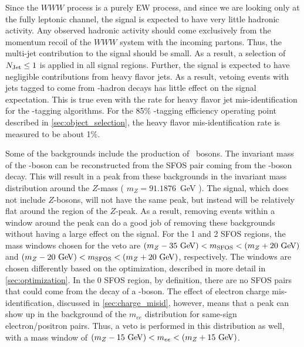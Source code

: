 




Since the $WWW$ process is a purely EW process, and since
we are looking only at the fully leptonic channel, the 
signal is expected to have very little hadronic 
activity. Any observed hadronic activity should come exclusively
from the momentum recoil of the $WWW$ system with the incoming
partons. Thus, the multi-jet contribution to the signal
should be small. As a result, a selection of $N_{\textrm{Jet}} \leq 1$
is applied in all signal regions.
Further, the signal is 
expected to have negligible contributions
from heavy flavor jets. As a result, vetoing events with jets
tagged to come from \bee-hadron decays has
little effect on the signal expectation. This is true even with 
the rate for heavy flavor jet mis-identification for the 
\bee-tagging algorithms. For the 
85\% \bee-tagging efficiency operating point described in 
\sec\ref{sec:object_selection}, the heavy flavor
mis-identification rate is measured to be about 1\%. %


Some of the backgrounds include the production of \z~bosons.
The invariant mass of the \z-boson can be reconstructed from the SFOS
pair coming from the \z-boson decay. 
This will result in a peak from these backgrounds
in the invariant mass distribution around 
the $Z$-mass ( $m_{Z}=91.1876$~GeV \cite{PDG:2014}).
The signal, which does not include $Z$-bosons, 
will not have the same peak, but instead
will be relatively flat around the region of the $Z$-peak. 
As a result, removing events within a window around the peak can do a good job
of removing these backgrounds without having a large effect on the signal.
For the 1 and 2 SFOS regions, the mass windows
chosen for the veto are $(m_Z-35\GeV )< m_{\textrm{SFOS}} < (m_Z+20\GeV)$
and $(m_Z-20\GeV )< m_{\textrm{SFOS}} < (m_Z+20\GeV)$, respectively.
The windows are chosen differently based on 
the optimization, described in more detail in \sec\ref{sec:optimization}.
In the 0 SFOS region, by definition, there are no SFOS pairs that could come 
from the decay of a \z-boson. 
The effect of electron charge mis-identification,
discussed in \sec\ref{sec:charge_misid}, however, means that a 
peak can show up in the background
of the $m_{ee}$ distribution for same-sign electron/positron pairs. 
Thus, a veto is performed in this distribution as well, with 
a mass window of $(m_Z-15\GeV) < m_{ee} < (m_Z+15\GeV)$.


